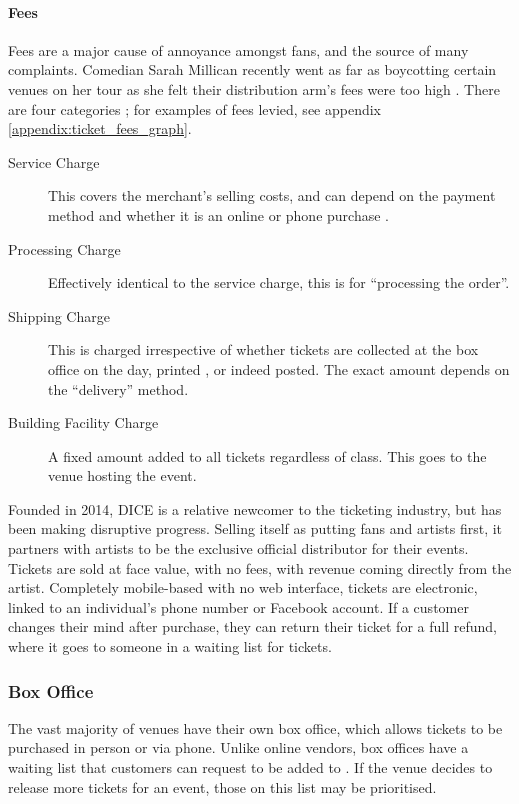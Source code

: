 \documentclass[12pt]{bhamdissertation}
\begin{document}
\paragraph{Fees}

Fees are a major cause of annoyance amongst fans, and the source of many complaints. Comedian Sarah Millican recently went as far as boycotting certain venues on her tour as she felt their distribution arm's fees were too high \autocite{C12}. There are four categories \autocite{T163}; for examples of fees levied, see appendix \ref{appendix:ticket_fees_graph}.

\begin{description}
    \item[Service Charge] This covers the merchant's selling costs, and can depend on the payment method and whether it is an online or phone purchase \autocite{T162}.
    \item[Processing Charge] Effectively identical to the service charge, this is for ``processing the order''.
    \item[Shipping Charge] This is charged irrespective of whether tickets are collected at the box office on the day, printed \autocite{P12}, or indeed posted. The exact amount depends on the ``delivery'' method.
    \item[Building Facility Charge] A fixed amount added to all tickets regardless of class. This goes to the venue hosting the event.
\end{description}

Founded in 2014, DICE is a relative newcomer to the ticketing industry, but has been making disruptive progress. Selling itself as putting fans and artists first, it partners with artists to be the exclusive official distributor for their events. Tickets are sold at face value, with no fees, with revenue coming directly from the artist. Completely mobile-based with no web interface, tickets are electronic, linked to an individual's phone number or Facebook account. If a customer changes their mind after purchase, they can return their ticket for a full refund, where it goes to someone in a waiting list for tickets.

\subsubsection{Box Office}

The vast majority of venues have their own box office, which allows tickets to be purchased in person or via phone. Unlike online vendors, box offices have a waiting list that customers can request to be added to \autocite{Le16}. If the venue decides to release more tickets for an event, those on this list may be prioritised.
\end{document}

